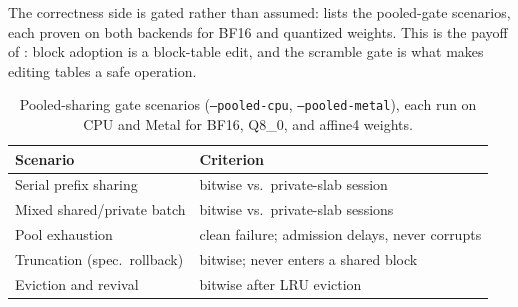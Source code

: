 \documentclass[sigconf,nonacm,screen]{acmart}
\newcommand{\code}[1]{\texttt{\small #1}}
\begin{document}
The correctness side is gated rather than assumed:  lists
the pooled-gate scenarios, each proven on both backends for BF16 and
quantized weights. This is the payoff of : block adoption is a
block-table edit, and the scramble gate is what makes editing tables a safe
operation.

\begin{table}[t]\centering\small
\caption{Pooled-sharing gate scenarios (\code{--pooled-cpu},
\code{--pooled-metal}), each run on CPU and Metal for BF16, Q8\_0, and
affine4 weights.}
\label{tab:pooled}
\begin{tabular}{@{}lp{3.6cm}@{}}
\toprule
Scenario & Criterion \\
\midrule
Serial prefix sharing & bitwise vs.\ private-slab session \\
Mixed shared/private batch & bitwise vs.\ private-slab sessions \\
Pool exhaustion & clean failure; admission delays, never corrupts \\
Truncation (spec.\ rollback) & bitwise; never enters a shared block \\
Eviction and revival & bitwise after LRU eviction \\
\bottomrule
\end{tabular}
\end{table}
\end{document}
